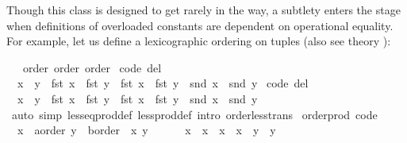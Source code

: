 \begin{isabellebody}
\begin{isamarkuptext}
  Though this  class is designed to get rarely in
  the way, a subtlety
  enters the stage when definitions of overloaded constants
  are dependent on operational equality.  For example, let
  us define a lexicographic ordering on tuples
  (also see theory \hyperlink{theory.Product-ord}{\mbox{}}):%
\end{isamarkuptext}%
\isamarkuptrue%
%
\isadelimquoteme
%
\endisadelimquoteme
%
\isatagquoteme
{}\isamarkupfalse%
\ {\isachardoublequoteopen}{\isacharasterisk}{\isachardoublequoteclose}\ {\isacharcolon}{\isacharcolon}\ {\isacharparenleft}order{\isacharcomma}\ order{\isacharparenright}\ order\isanewline
{}\isanewline
\isanewline
{}\isamarkupfalse%
\ {\isacharbrackleft}code\ del{\isacharbrackright}{\isacharcolon}\isanewline
\ \ {\isachardoublequoteopen}x\ {\isasymle}\ y\ {\isasymlongleftrightarrow}\ fst\ x\ {\isacharless}\ fst\ y\ {\isasymor}\ fst\ x\ {\isacharequal}\ fst\ y\ {\isasymand}\ snd\ x\ {\isasymle}\ snd\ y{\isachardoublequoteclose}\isanewline
\isanewline
{}\isamarkupfalse%
\ {\isacharbrackleft}code\ del{\isacharbrackright}{\isacharcolon}\isanewline
\ \ {\isachardoublequoteopen}x\ {\isacharless}\ y\ {\isasymlongleftrightarrow}\ fst\ x\ {\isacharless}\ fst\ y\ {\isasymor}\ fst\ x\ {\isacharequal}\ fst\ y\ {\isasymand}\ snd\ x\ {\isacharless}\ snd\ y{\isachardoublequoteclose}\isanewline
\isanewline
{}\isamarkupfalse%
\ \isamarkupfalse%
\isanewline
{}\isamarkupfalse%
\ {\isacharparenleft}auto\ simp{\isacharcolon}\ less{\isacharunderscore}eq{\isacharunderscore}prod{\isacharunderscore}def\ less{\isacharunderscore}prod{\isacharunderscore}def\ intro{\isacharcolon}\ order{\isacharunderscore}less{\isacharunderscore}trans{\isacharparenright}\isanewline
\isanewline
{}\isamarkupfalse%
\isanewline
\isanewline
{}\isamarkupfalse%
\ order{\isacharunderscore}prod\ {\isacharbrackleft}code{\isacharbrackright}{\isacharcolon}\isanewline
\ \ {\isachardoublequoteopen}{\isacharparenleft}x{}\ {\isasymColon}\ {\isacharprime}a{\isasymColon}order{\isacharcomma}\ y{}\ {\isasymColon}\ {\isacharprime}b{\isasymColon}order{\isacharparenright}\ {\isacharless}\ {\isacharparenleft}x{}{\isacharcomma}\ y{}{\isacharparenright}\ {\isasymlongleftrightarrow}\isanewline
\ \ \ \ \ x{}\ {\isacharless}\ x{}\ {\isasymor}\ x{}\ {\isacharequal}\ x{}\ {\isasymand}\ y{}\ {\isacharless}\ y{}{\isachardoublequoteclose}\isanewline

\end{isabellebody}
